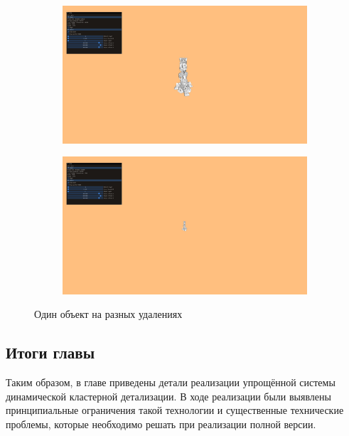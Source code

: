 \begin{figure}[ht]
    \begin{subfigure}{.45\textwidth}
        \includegraphics[width=\textwidth]{pics/impl-example-2.png}
    \end{subfigure}
    \begin{subfigure}{.45\textwidth}
        \includegraphics[width=\textwidth]{pics/impl-example-3.png}
    \end{subfigure}
    \caption{Один объект на разных удалениях}
    \label{fig:impl-example}
\end{figure}

\subsection*{Итоги главы}
Таким образом, в главе приведены детали реализации упрощённой системы динамической кластерной детализации.
В ходе реализации были выявлены принципиальные ограничения такой технологии и существенные технические проблемы, которые необходимо решать при реализации полной версии.
